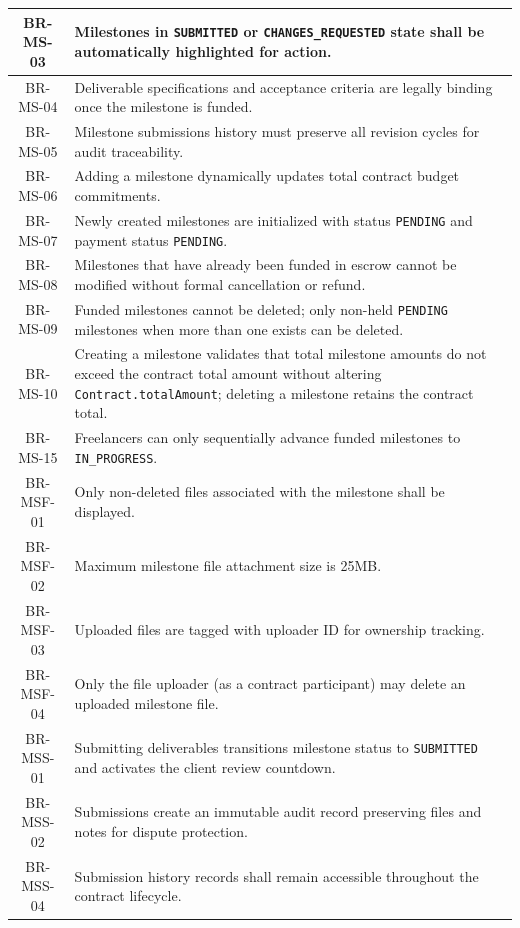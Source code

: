 \begin{longtable}{|c|p{12cm}|}
    BR-MS-03 & Milestones in \texttt{SUBMITTED} or \texttt{CHANGES\_REQUESTED} state shall be automatically highlighted for action. \\ \hline
    BR-MS-04 & Deliverable specifications and acceptance criteria are legally binding once the milestone is funded. \\ \hline
    BR-MS-05 & Milestone submissions history must preserve all revision cycles for audit traceability. \\ \hline
    BR-MS-06 & Adding a milestone dynamically updates total contract budget commitments. \\ \hline
    BR-MS-07 & Newly created milestones are initialized with status \texttt{PENDING} and payment status \texttt{PENDING}. \\ \hline
    BR-MS-08 & Milestones that have already been funded in escrow cannot be modified without formal cancellation or refund. \\ \hline
    BR-MS-09 & Funded milestones cannot be deleted; only non-held \texttt{PENDING} milestones when more than one exists can be deleted. \\ \hline
    BR-MS-10 & Creating a milestone validates that total milestone amounts do not exceed the contract total amount without altering \texttt{Contract.totalAmount}; deleting a milestone retains the contract total. \\ \hline
    BR-MS-15 & Freelancers can only sequentially advance funded milestones to \texttt{IN\_PROGRESS}. \\ \hline
    BR-MSF-01 & Only non-deleted files associated with the milestone shall be displayed. \\ \hline
    BR-MSF-02 & Maximum milestone file attachment size is 25MB. \\ \hline
    BR-MSF-03 & Uploaded files are tagged with uploader ID for ownership tracking. \\ \hline
    BR-MSF-04 & Only the file uploader (as a contract participant) may delete an uploaded milestone file. \\ \hline
    BR-MSS-01 & Submitting deliverables transitions milestone status to \texttt{SUBMITTED} and activates the client review countdown. \\ \hline
    BR-MSS-02 & Submissions create an immutable audit record preserving files and notes for dispute protection. \\ \hline
    BR-MSS-04 & Submission history records shall remain accessible throughout the contract lifecycle. \\ \hline

\end{longtable}

